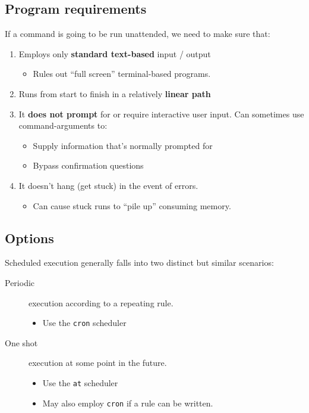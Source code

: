 \documentclass[slides]{pgnotes}
\begin{document}
\subsection{Program requirements}

If a command is going to be run unattended, we need to make sure that:
\begin{enumerate}
\item Employs only \textbf{standard text-based} input / output
  \begin{itemize}
  \item Rules out ``full screen'' terminal-based programs. 
  \end{itemize}
\item Runs from start to finish in a relatively \textbf{linear path}
\item It \textbf{does not prompt} for or require interactive user input.
  Can sometimes use command-arguments to:
  \begin{itemize}
  \item Supply information that's normally prompted for
  \item Bypass confirmation questions 
  \end{itemize}
\item It doesn't hang (get stuck) in the event of errors.
  \begin{itemize}
  \item Can cause stuck runs to ``pile up'' consuming memory. 
  \end{itemize}
\end{enumerate}

\subsection{Options}

Scheduled execution generally falls into two distinct but similar scenarios:

\begin{description}
\item[Periodic] execution according to a repeating rule.
  \begin{itemize}
  \item Use the \texttt{cron} scheduler
  \end{itemize}
\item[One shot] execution at some point in the future.
  \begin{itemize}
  \item Use the \texttt{at} scheduler
  \item May also employ \texttt{cron} if a rule can be written.
  \end{itemize}
\end{description}
\end{document}
